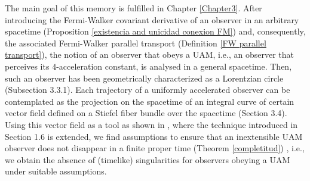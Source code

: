 \documentclass[11pt]{book}
\begin{document}

The main goal of this memory is fulfilled in Chapter \ref{Chapter3}. After introducing the Fermi-Walker covariant derivative of an observer in an arbitrary spacetime (Proposition \ref{existencia and unicidad conexion FM}) and, consequently, the associated Fermi-Walker parallel transport (Definition \ref{FW parallel transport}), the notion of an observer that obeys a UAM, i.e., an observer that perceives its $4$-acceleration constant, is analysed in a general spacetime. Then, such an observer has been geometrically characterized as a Lorentzian circle (Subsection 3.3.1). Each trajectory of a uniformly accelerated observer can be contemplated as the projection on the spacetime of an integral curve of certain vector field defined on a Stiefel fiber bundle over the spacetime (Section 3.4). Using this vector field as a tool as shown in \cite[Section 4]{UAM}, where the technique introduced in Section 1.6 is extended, we find assumptions to ensure that an inextensible UAM observer does not disappear in a finite proper time (Theorem \ref{completitud}) \cite[Theorem 4.5]{UAM}, i.e., we obtain the absence of (timelike) singularities for observers obeying a UAM under suitable assumptions. 

\end{document}
